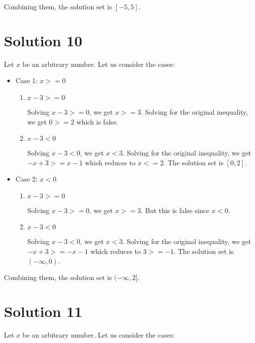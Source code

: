 \documentclass{article}
\begin{document}
Combining them, the solution set is $[-5, 5]$.

\section{Solution 10}

Let $x$ be an arbitrary number. Let us consider the cases:

\begin{itemize}
\item Case 1: $x >= 0$

  \begin{enumerate}
  \item $x - 3 >= 0$

    Solving $x - 3 >= 0$, we get $x >= 3$. Solving for the original
    inequality, we get $ 0 >= 2$ which is false.
    
  \item $x - 3 < 0$

    Solving $x - 3 < 0$, we get $x < 3$. Solving for the original
    inequality, we get $-x + 3 >= x - 1$ which reduces to $x <= 2$.
    The solution set is $[0, 2]$.
  \end{enumerate}

\item Case 2: $x < 0$

  \begin{enumerate}
  \item $x - 3 >= 0$

    Solving $x - 3 >= 0$, we get $x >= 3$. But this is false since
    $x < 0$.
    
  \item $x - 3 < 0$

    Solving $x - 3 < 0$, we get $x < 3$. Solving for the original
    inequality, we get $-x + 3 >= -x - 1$ which reduces to $3 >= -1$.
    The solution set is $(-\infty, 0)$.
  \end{enumerate}

\end{itemize}

Combining them, the solution set is $(-\infty, 2]$.

\section{Solution 11}

Let $x$ be an arbitrary number. Let us consider the cases:
\end{document}
